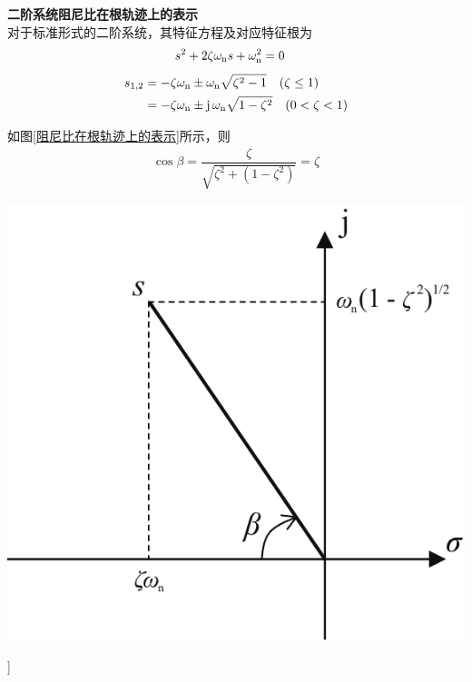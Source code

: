 {
	\begin{minipage}{0.6\linewidth}
		\textbf{二阶系统阻尼比在根轨迹上的表示}\\
		\hspace*{2em}对于标准形式的二阶系统，其特征方程及对应特征根为
		\begin{align*}
			s^2 + 2 \zeta \omega_{\text{n}} s + \omega_{{\rm{n}}}^2 &= 0
		\end{align*}
		\vspace*{-3em}
		\begin{align*}
			s_{1,2} &= - \zeta \omega_{{\rm{n}}} \pm \omega_{{\rm{n}}}\sqrt{\zeta^2 - 1} \quad (\zeta \le 1)\\
			&= - \zeta \omega_{{\rm{n}}} \pm \text{j} \, \omega_{{\rm{n}}}\sqrt{1 - \zeta^2} \quad (0 <\zeta < 1)
		\end{align*}

		如图\ref{阻尼比在根轨迹上的表示}所示，则
		\begin{align*}
			\cos \beta = \dfrac{\zeta}{\sqrt{\zeta^2 + (1 - \zeta^2)}} = \zeta
		\end{align*}
	\end{minipage}
	\begin{minipage}{0.4\linewidth}
		\centering
		\includegraphics[width=0.8\linewidth]{pic/阻尼比的表示.pdf}
		\label{阻尼比在根轨迹上的表示}
	\end{minipage}
}
]

